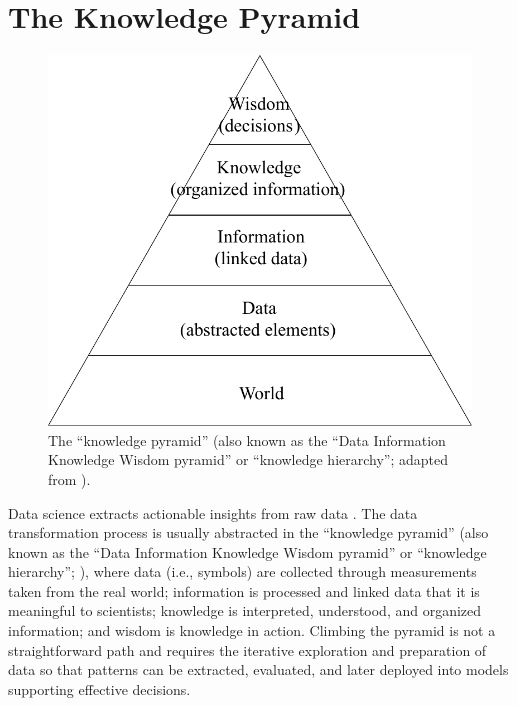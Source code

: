 \chapter{The Knowledge Pyramid}
\begin{figure}[t]
    \centering
    \includegraphics[scale=.7]{global/DIKW.pdf}
    \caption{The ``knowledge pyramid'' (also known as the ``Data Information Knowledge Wisdom pyramid'' or ``knowledge hierarchy''; adapted from \cite{DBLP:journals/oir/Stuart15b}).}
    \label{fig:dikw}
\end{figure}

Data science extracts actionable insights from raw data \cite{kelleher2018data}. The data transformation process is usually abstracted in the ``knowledge pyramid'' (also known as the ``Data Information Knowledge Wisdom pyramid'' or ``knowledge hierarchy''; ), where data (i.e., symbols) are collected through measurements taken from the real world; information is processed and linked data that it is meaningful to scientists; knowledge is interpreted, understood, and organized information; and wisdom is knowledge in action. Climbing the pyramid is not a straightforward path and requires the iterative exploration and preparation of data so that patterns can be extracted, evaluated, and later deployed into models supporting effective decisions. 


